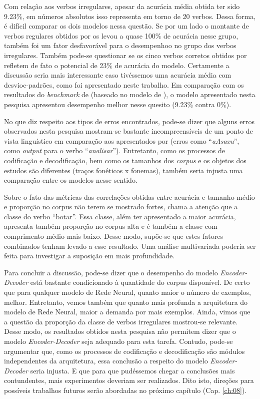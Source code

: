 Com relação aos verbos irregulares, apesar da acurácia média obtida ter sido 9.23\%, em números absolutos isso representa em torno de 20 verbos. Dessa forma, é difícil comparar os dois modelos nessa questão. Se por um lado o montante de verbos regulares obtidos por \cite{kirov:2018} os levou a quase 100\% de acurácia nesse grupo, também foi um fator desfavorável para o desempenhoo no grupo dos verbos irregulares. Também pode-se questionar se os cinco verbos corretos obtidos por \cite{kirov:2018} refletem de fato o potencial de 23\% de acurácia do modelo. Certamente a discussão seria mais interessante caso tivéssemos uma acurácia média com desvioc-padrões, como foi apresentado neste trabalho. Em comparação com os resultados do \textit{benchmark} de \cite{kirov:2018} (baseado no modelo de \cite{Albright2003RulesVA}), o modelo apresentado nesta pesquisa apresentou desempenho melhor nesse quesito (9.23\% contra 0\%). 

No que diz respeito aos tipos de erros encontrados, pode-se dizer que alguns erros observados nesta pesquisa mostram-se bastante incompreensíveis de um ponto de vista linguístico em comparação aos apresentados por \cite{kirov:2018} (erros como “\textit{aAsaxu}”, como \textit{output} para o verbo “\textit{analisar}”). Entretanto, como os processos de codificação e decodificação, bem como os tamanhos dos \textit{corpus} e os objetos dos estudos são diferentes (traços fonéticos x fonemas), também seria injusta uma comparação entre os modelos nesse sentido.

Sobre o fato das métricas das correlações obtidas entre acurácia e tamanho médio e proporção no corpus não terem se mostrado fortes,
 chama a atenção que a classe do verbo “botar”. Essa classe, além ter apresentado a maior acurácia, apresenta também proporção no corpus  alta e é também a classe com comprimento médio mais baixo. Desse modo, supõe-se que estes fatores combinados tenham levado a esse resultado. Uma análise multivariada poderia ser feita para investigar a suposição em mais profundidade.

Para concluir a discussão, pode-se dizer que o desempenho do modelo \textit{Encoder-Decoder} está bastante condicionado à quantidade do corpus disponível. De certo que para qualquer modelo de Rede Neural, quanto maior o número de exemplos, melhor. Entretanto, vemos também que quanto mais profunda a arquitetura do modelo de Rede Neural, maior a demanda por mais exemplos. Ainda, vimos que a questão da proporção da classe de verbos irregulares mostrou-se relevante. Desse modo, os resultados obtidos nesta pesquisa não permitem dizer que o modelo \textit{Encoder-Decoder} seja adequado para esta tarefa. Contudo, pode-se argumentar que, como os processos de codificação e decodificação são módulos independentes da arquitetura, essa conclusão a respeito do modelo \textit{Encoder-Decoder} seria injusta. E que para que pudéssemos chegar a conclusões mais contundentes, mais experimentos deveriam ser realizados. Dito isto, direções para possíveis trabalhos futuros serão abordadas no próximo capítulo (Cap. \ref{ch:08}). 

  